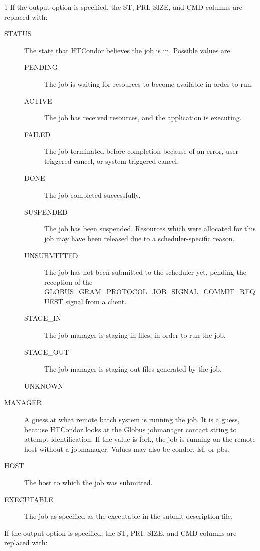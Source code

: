 \begin{ManPage}{\label{man-condor-q}}{1}
If the output option  is specified, the ST, PRI, SIZE, and CMD
columns are replaced with:
\begin{description}
\item[STATUS] The state that HTCondor believes the job is in.
Possible values are
  \begin{description}
    \item[PENDING] The job is waiting for resources to become available
    in order to run.
    \item[ACTIVE] The job has received resources, and the application
    is executing.
    \item[FAILED] The job terminated before completion because of an error,
    user-triggered cancel, or system-triggered cancel.
    \item[DONE] The job completed successfully.
    \item[SUSPENDED] The job has been suspended.
    Resources which were allocated for this job may have been
    released due to a scheduler-specific reason.
    \item[UNSUBMITTED] The job has not been submitted to the scheduler yet,
    pending the reception of the 
    GLOBUS\_GRAM\_PROTOCOL\_JOB\_SIGNAL\_COMMIT\_REQUEST signal from a client.
    \item[STAGE\_IN] The job manager is staging in files,
    in order to run the job.
    \item[STAGE\_OUT] The job manager is staging out files
    generated by the job.
    \item[UNKNOWN]
  \end{description}
\item[MANAGER] 
A guess at what remote batch system is running the job.
It is a guess, because HTCondor looks at the Globus jobmanager contact
string to attempt identification.
If the value is fork, the job is running on the
remote host without a jobmanager.
Values may also be condor, lsf, or pbs.
\item[HOST] The host to which the job was submitted.
\item[EXECUTABLE] The job as specified as the executable in the
submit description file.
\end{description}

If the output option  is specified, the ST, PRI, SIZE, and CMD
columns are replaced with:


\end{ManPage}
